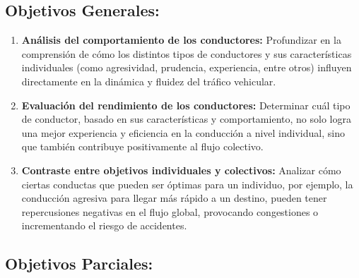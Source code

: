 \subsection{Objetivos Generales:}

\begin{enumerate}
    \item \textbf{Análisis del comportamiento de los conductores:} Profundizar en la comprensión de cómo los distintos tipos de conductores y sus características individuales (como agresividad, prudencia, experiencia, entre otros) influyen directamente en la dinámica y fluidez del tráfico vehicular.
    \item \textbf{Evaluación del rendimiento de los conductores:} Determinar cuál tipo de conductor, basado en sus características y comportamiento, no solo logra una mejor experiencia y eficiencia en la conducción a nivel individual, sino que también contribuye positivamente al flujo colectivo.
    \item \textbf{Contraste entre objetivos individuales y colectivos:} Analizar cómo ciertas conductas que pueden ser óptimas para un individuo, por ejemplo, la conducción agresiva para llegar más rápido a un destino, pueden tener repercusiones negativas en el flujo global, provocando congestiones o incrementando el riesgo de accidentes.
\end{enumerate}

\subsection{Objetivos Parciales:}

